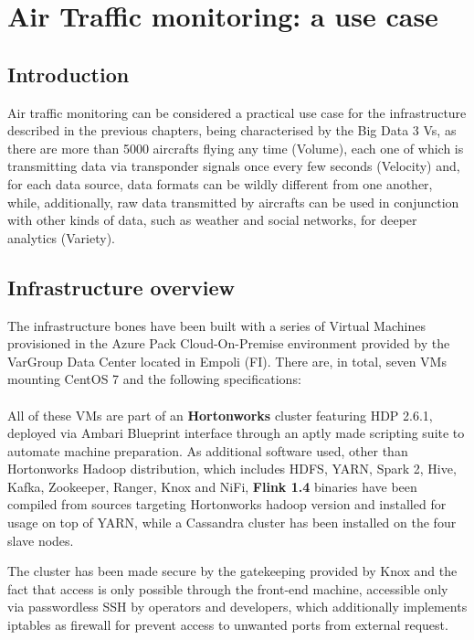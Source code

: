 \chapter{Air Traffic monitoring: a use case}

\section{Introduction}

Air traffic monitoring can be considered a practical use case for the infrastructure described in the previous chapters, being characterised by the Big Data 3 Vs, as there are more than 5000 aircrafts flying any time (Volume), each one of which is transmitting data via transponder signals once every few seconds (Velocity) and, for each data source, data formats can be wildly different from one another, while, additionally, raw data transmitted by aircrafts can be used in conjunction with other kinds of data, such as weather and social networks, for deeper analytics (Variety).

\section{Infrastructure overview}

The infrastructure bones have been built with a series of Virtual Machines provisioned in the Azure Pack Cloud-On-Premise environment provided by the VarGroup Data Center located in Empoli (FI). There are, in total, seven VMs mounting CentOS 7 and the following specifications:
\\
\\
All of these VMs are part of an \textbf{Hortonworks} cluster featuring HDP 2.6.1, deployed via Ambari Blueprint interface through an aptly made scripting suite to automate machine preparation. As additional software used, other than Hortonworks Hadoop distribution, which includes HDFS, YARN, Spark 2, Hive, Kafka, Zookeeper, Ranger, Knox and NiFi, \textbf{Flink 1.4} binaries have been compiled from sources targeting Hortonworks hadoop version and installed for usage on top of YARN, while a Cassandra cluster has been installed on the four slave nodes.

The cluster has been made secure by the gatekeeping provided by Knox and the fact that access is only possible through the front-end machine, accessible only via passwordless SSH by operators and developers, which additionally implements iptables as firewall for prevent access to unwanted ports from external request.


